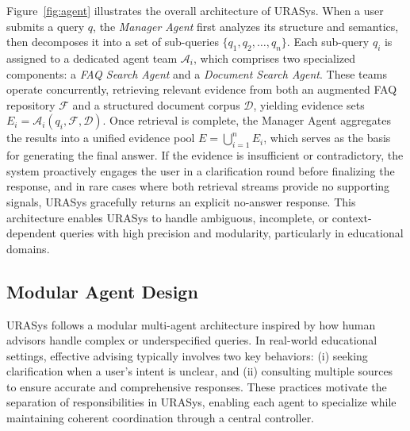 \documentclass[11pt]{article}
\begin{document}
Figure~\ref{fig:agent} illustrates the overall architecture of URASys. When a user submits a query $q$, the \textit{Manager Agent} first analyzes its structure and semantics, then decomposes it into a set of sub-queries $\{q_1, q_2, \dots, q_n\}$. Each sub-query $q_i$ is assigned to a dedicated agent team $\mathcal{A}_i$, which comprises two specialized components: a \textit{FAQ Search Agent} and a \textit{Document Search Agent}. These teams operate concurrently, retrieving relevant evidence from both an augmented FAQ repository $\mathcal{F}$ and a structured document corpus $\mathcal{D}$, yielding evidence sets $E_i = \mathcal{A}_i(q_i, \mathcal{F}, \mathcal{D})$. Once retrieval is complete, the Manager Agent aggregates the results into a unified evidence pool $E = \bigcup_{i=1}^{n} E_i$, which serves as the basis for generating the final answer. If the evidence is insufficient or contradictory, the system proactively engages the user in a clarification round before finalizing the response, and in rare cases where both retrieval streams provide no supporting signals, URASys gracefully returns an explicit no-answer response. This architecture enables URASys to handle ambiguous, incomplete, or context-dependent queries with high precision and modularity, particularly in educational domains.




\subsection{Modular Agent Design}
\label{sec:design}
URASys follows a modular multi-agent architecture inspired by how human advisors handle complex or underspecified queries. In real-world educational settings, effective advising typically involves two key behaviors: (i) seeking clarification when a user’s intent is unclear, and (ii) consulting multiple sources to ensure accurate and comprehensive responses. These practices motivate the separation of responsibilities in URASys, enabling each agent to specialize while maintaining coherent coordination through a central controller.
\end{document}
